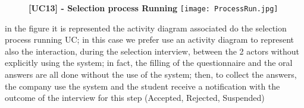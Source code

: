 			\begin{figure}[H]
				\centering
				{\bfseries [UC13] - Selection process Running}
				\texttt{[image: ProcessRun.jpg]}
				
			\end{figure}
			
			in the figure it is represented the activity diagram associated do the selection process running UC; in this case we prefer use an activity diagram to represent also the interaction, during the selection interview, between the 2 actors without explicitly using the system; in fact, the filling of the questionnaire and the oral answers are all done without the use of the system; then, to collect the answers, the company use the system and the student receive a notification with the outcome of the interview for this step (Accepted, Rejected, Suspended)
		
